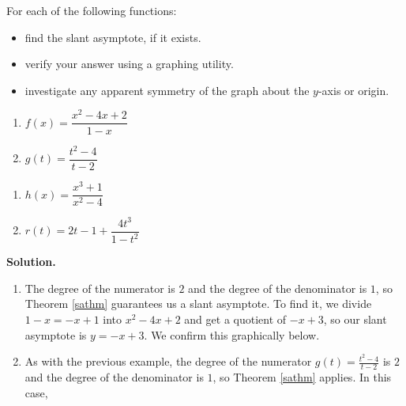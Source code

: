 \documentclass{ximera}
\begin{document}
\begin{ex} \label{saexample}  For each of the following functions:

\begin{itemize}

\item find the slant asymptote, if it exists.

\item  verify your answer using a graphing utility.

\item  investigate any apparent symmetry of the graph about the $y$-axis or origin.

\end{itemize}


\begin{multicols}{2}
\begin{enumerate}

\item  $f(x) = \dfrac{x^2-4x+2}{1-x}$  

\item  \label{sacancel} $g(t) = \dfrac{t^2-4}{t-2}$

\setcounter{HW}{\value{enumi}}
\end{enumerate}
\end{multicols}

\begin{multicols}{2}
\begin{enumerate}
\setcounter{enumi}{\value{HW}}


\item  $h(x) = \dfrac{x^3+1}{x^2-4}$

\item  $r(t) = 2t-1+\dfrac{4t^3}{1-t^2}$ 

\setcounter{HW}{\value{enumi}}
\end{enumerate}
\end{multicols}



{\bf Solution.}

\begin{enumerate}

\item  The degree of the numerator is $2$ and the degree of the denominator is $1$, so Theorem \ref{sathm} guarantees us a slant asymptote.  To find it, we divide $1-x = -x+1$ into $x^2-4x+2$ and get a quotient of $-x+3$, so our slant asymptote is $y=-x+3$.  We confirm this graphically below.

\item  As with the previous example, the degree of the numerator $g(t) = \frac{t^2-4}{t-2}$ is $2$ and the degree of the denominator is $1$, so Theorem \ref{sathm} applies.  In this case, 


\end{enumerate}
\end{ex}
\end{document}
